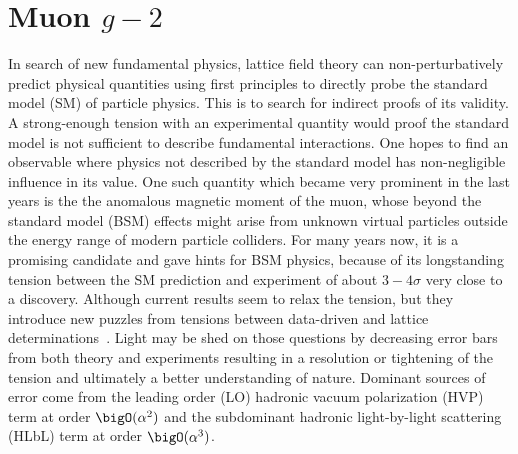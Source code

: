 


























\section{Muon $g-2$}
\label{sec:intro:gm2}


In search of new fundamental physics, lattice field theory can non-perturbatively predict physical quantities using first principles to directly probe the standard model (SM) of particle physics.
This is to search for indirect proofs of its validity.
A strong-enough tension with an experimental quantity would proof the standard model is not sufficient to describe fundamental interactions.
One hopes to find an observable where physics not described by the standard model has non-negligible influence in its value.
One such quantity which became very prominent in the last years is the the anomalous magnetic moment of the muon, whose beyond the standard model (BSM) effects might arise from unknown virtual particles outside the energy range of modern particle colliders.
For many years now, it is a promising candidate and gave hints for BSM physics, because of its longstanding tension between the SM prediction and experiment of about $3-4 \sigma$ \cite{snowmass:2020} very close to a discovery.
Although current results seem to relax the tension, but they introduce new puzzles from tensions between data-driven and lattice determinations~\cite{snowmass:2025}.
Light may be shed on those questions by decreasing error bars from both theory and experiments resulting in a resolution or tightening of the tension and ultimately a better understanding of nature.
Dominant sources of error come from the leading order (LO) hadronic vacuum polarization (HVP) term at order $\bigO(\alpha^{2})$ and the subdominant hadronic light-by-light scattering (HLbL) term at order $\bigO(\alpha^{3})$.

